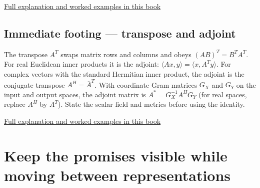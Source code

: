 \hyperref[01-foundations-i-ch018-a-normal-is-a-measuring-rule-before-it-is-an-arrow]{Full explanation and worked examples in this book}

\subsection{Immediate footing --- transpose and adjoint}\label{01-foundations-i-ch018-immediate-footing-transpose-and-adjoint}

The transpose \(A^T\) swaps matrix rows and columns and obeys \((AB)^T=B^TA^T\). For real Euclidean inner products it is the adjoint: \(\langle Ax,y\rangle=\langle x,A^Ty\rangle\). For complex vectors with the standard Hermitian inner product, the adjoint is the conjugate transpose \(A^H=\overline{A}^T\). With coordinate Gram matrices \(G_X\) and \(G_Y\) on the input and output spaces, the adjoint matrix is \(A^*=G_X^{-1}A^HG_Y\) (for real spaces, replace \(A^H\) by \(A^T\)). State the scalar field and metrics before using the identity.

\hyperref[01-foundations-i-ch018-transpose-lets-us-compare-measurements-and-structure]{Full explanation and worked examples in this book}

\section{Keep the promises visible while moving between representations}\label{01-foundations-i-ch018-keep-the-promises-visible-while-moving-between-representations}

